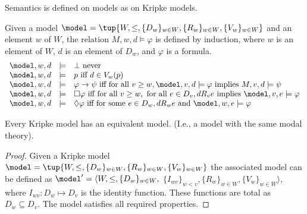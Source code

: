 

Semantics is defined on \kripkeplus models as on Kripke models. 

\begin{definition}
  Given a model
  $\model = \tup{W, \le, \{D_w \}_{w\in W}, \{R_w\}_{w\in W},
    \{V_w\}_{w\in W}}$ and an element $w$ of $W$, the relation
    $M, w, d \models \varphi$ is defined by induction, where $w$ is an
    element of $W$, $d$ is an element of $D_w$, and
    $\varphi$ is a formula.
    $$
    \begin{array}{rcl}
\model, w, d & \models & \bot \text{ never}\\
\model, w, d & \models & p \text{ iff } d \in V_w(p)\\
\model, w, d & \models & \varphi \to \psi \text{ iff  for all } v \ge w,
\model, v, d  \models  \varphi \text{ implies } M, v, d \models \psi \\
\model, w, d & \models & \Box \varphi \text{ iff for all } v \ge w, \text{ for all } e \in D_v ,
dR_v e \text{ implies } \model, v, e \models \varphi\\
\model, w, d & \models & \Diamond\varphi \text{ iff for some }  e \in D_w , dR_w e \text{ and } \model, w, e \models \varphi
    \end{array}
    $$
\end{definition}

\begin{proposition}
  Every Kripke model has an equivalent \kripkeplus model. (I.e., a
  model with the same modal theory).
\end{proposition}

\begin{proof}
  Given a Kripke model
  $\model = \tup{W, \le, \{D_w \}_{w\in W}, \{R_w\}_{w\in W},
    \{V_w\}_{w\in W}}$ the associated \kripkeplus model can be defined
  as $\model' = \langle W, \le, \{D_w \}_{w\in W},$
  $\{I_{wv}\}_{w < v}, \{R_w\}_{w\in W}, \{V_w\}_{w\in W}\rangle$,
  where $I_{wv}:D_w \mapsto D_v$ is the identity function.  These
  functions are total as $D_w \subseteq D_v$.  The model satisfies all
  required properties.
\end{proof}

